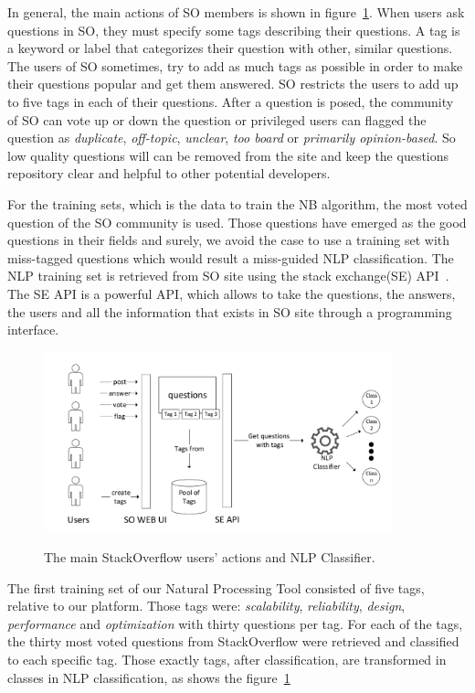In general, the main actions of SO members is shown in figure~\ref{fig:stackoverflow_questions}. When users ask questions in SO, they must specify some tags describing their questions. A tag is a keyword or label that categorizes their question with other, similar questions. The users of SO sometimes, try to add as much tags as possible in order to make their questions popular and get them answered. SO restricts the users to add up to five tags in each of their questions. After a question is posed, the community of SO can vote up or down the question or privileged users can flagged the question as \emph{duplicate}, \emph{off-topic}, \emph{unclear}, \emph{too board} or \emph{primarily opinion-based}. So low quality questions will can be removed from the site and keep the questions repository clear and helpful to other potential developers.

For the training sets, which is the data to train the NB algorithm, the most voted question of the SO community is used. Those questions have emerged as the good questions in their fields and surely, we avoid the case to use a training set with miss-tagged questions which would result a miss-guided NLP classification. The NLP training set is retrieved from SO site using the stack exchange(SE) API~\cite{stackexchange_url}. The SE API is a powerful API, which allows to take the questions, the answers, the users and all the information that exists in SO site through a programming interface.

\begin{figure}[h]
	\caption{The main StackOverflow users' actions and NLP Classifier. }
	\includegraphics[width=0.9\textwidth]{./fig/StackOverFlow.pdf}
	\centering
	\label{fig:stackoverflow_questions}
\end{figure}

The first training set of our Natural Processing Tool consisted of five tags, relative to our platform. Those tags were: \emph{scalability}, \emph{reliability}, \emph{design}, \emph{performance} and \emph{optimization} with thirty questions per tag. For each of the tags, the thirty most voted questions from StackOverflow were retrieved and classified to each specific tag. Those exactly tags, after classification, are transformed in classes in NLP classification, as shows the figure~\ref{fig:stackoverflow_questions}

